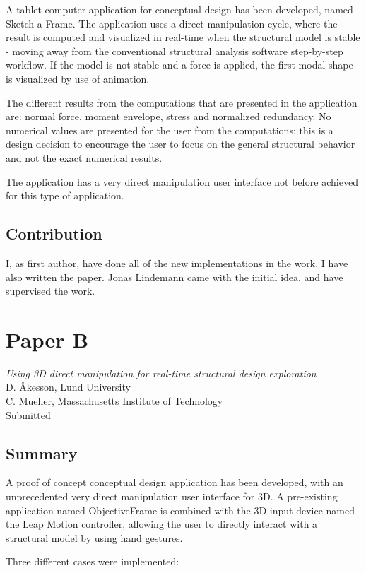 A tablet computer application for conceptual design has been developed, named Sketch a Frame. The application uses a direct manipulation cycle, where the result is computed and visualized in real-time when the structural model is stable - moving away from the conventional structural analysis software step-by-step workflow. If the model is not stable and a force is applied, the first modal shape is visualized by use of animation.

The different results from the computations that are presented in the application are: normal force, moment envelope, stress and normalized redundancy. No numerical values are presented for the user from the computations; this is a design decision to encourage the user to focus on the general structural behavior and not the exact numerical results. 

The application has a very direct manipulation user interface not before achieved for this type of application.

\subsection*{Contribution}
I, as first author, have done all of the new implementations in the work. I have also written the paper. Jonas Lindemann came with the initial idea, and have supervised the work.

\newpage
\section{Paper B}
\textit{Using 3D direct manipulation for real-time structural design exploration} \\
D. Åkesson, Lund University \\
C. Mueller, Massachusetts Institute of Technology \\
Submitted

\subsection*{Summary}

A proof of concept conceptual design application has been developed, with an unprecedented very direct manipulation user interface for 3D. A pre-existing application named ObjectiveFrame is combined with the 3D input device named the Leap Motion controller, allowing the user to directly interact with a structural model by using hand gestures.

Three different cases were implemented:

